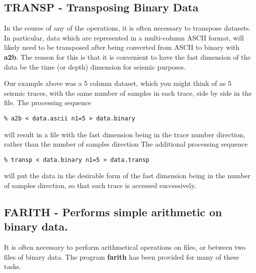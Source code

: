 {{{\subsection{TRANSP - Transposing Binary Data}

In the course of any of the operations, it is often necessary
to transpose datasets. In particular, data which are represented
in a multi-column ASCII format, will likely need to be transposed
after being converted from ASCII to binary with {\bf a2b}.
The reason for this is that it is convenient to have the fast
dimension of the data be the time (or depth) dimension
for seismic purposes. 

Our example above was a 5 column dataset, which you might think
of as  5 seismic traces, with the same number of samples in each
trace, side by side in the file. The processing
sequence
{\small\begin{verbatim}
% a2b < data.ascii n1=5 > data.binary 
\end{verbatim}}\noindent
will result in a file with the fast dimension being in the 
trace number direction, rather than the number of samples direction
The additional processing sequence
{\small\begin{verbatim}
% transp < data.binary n1=5 > data.transp
\end{verbatim}}\noindent
will put the data in the desirable form of the fast dimension being
in the number of samples direction, so that each trace is accessed
successively.

\subsection{FARITH - Performs simple arithmetic on binary data.}

It is often necessary to perform arithmetical operations on files,
or between two files of binary data. The program {\bf farith\/} has
been provided for many of these tasks.

}}}
